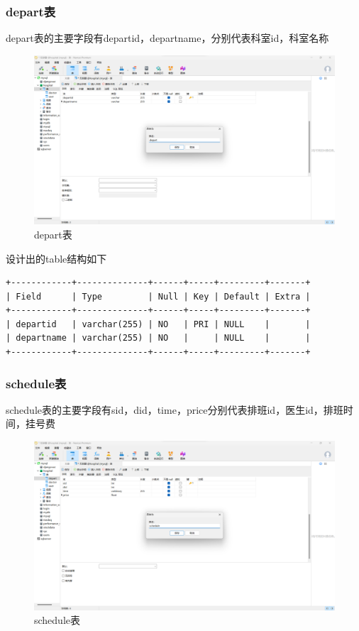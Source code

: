 \documentclass[UTF8,12pt]{article}
\begin{document}
\newpage

\subsubsection{depart表}

depart表的主要字段有departid，departname，分别代表科室id，科室名称

\begin{figure}[htbp]
    \centering
    \includegraphics[width=1.0\textwidth]{imgs/7.png}
    \caption{depart表}
\end{figure}

设计出的table结构如下

\begin{lstlisting}[frame=shadowbox]
+------------+--------------+------+-----+---------+-------+
| Field      | Type         | Null | Key | Default | Extra |
+------------+--------------+------+-----+---------+-------+
| departid   | varchar(255) | NO   | PRI | NULL    |       |
| departname | varchar(255) | NO   |     | NULL    |       |
+------------+--------------+------+-----+---------+-------+
\end{lstlisting}

\newpage

\subsubsection{schedule表}

schedule表的主要字段有sid，did，time，price分别代表排班id，医生id，排班时间，挂号费

\begin{figure}[htbp]
    \centering
    \includegraphics[width=1.0\textwidth]{imgs/8.png}
    \caption{schedule表}
\end{figure}
\end{document}
